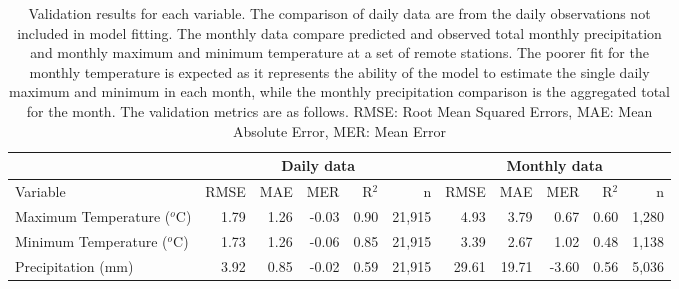 \begin{table}[ht]
\begin{center}
\begin{tabular}{lrrrrr|rrrrr}
  \hline & \multicolumn{5}{c|}{Daily data} & \multicolumn{5}{c}{Monthly data} \\ \hline
Variable & RMSE & MAE & MER & R$^2$ & n  & RMSE & MAE & MER & R$^2$ & n \\ 
  \hline
Maximum Temperature ($^o$C) & 1.79 & 1.26 & -0.03 & 0.90 & 21,915 & 4.93 & 3.79 & 0.67 & 0.60 &1,280\\ 
  Minimum Temperature  ($^o$C) & 1.73 & 1.26 & -0.06 & 0.85 & 21,915 &
  3.39 & 2.67 & 1.02 & 0.48 & 1,138 \\ 
  Precipitation (mm) & 3.92 & 0.85 & -0.02 & 0.59 & 21,915 & 29.61 &
  19.71 & -3.60 & 0.56 & 5,036\\ 
   \hline
\end{tabular}
\caption{Validation results for each variable.  The comparison of daily data are from the daily observations not included in model fitting. The monthly data compare predicted and observed total monthly precipitation and monthly maximum and minimum temperature at a set of remote stations.  The poorer fit for the monthly temperature is expected as it represents the ability of the model to estimate the single daily maximum and minimum in each month, while the monthly precipitation comparison is the aggregated total for the month. The validation metrics are as follows. RMSE: Root Mean Squared Errors, MAE: Mean Absolute Error, MER: Mean Error}
\label{tab:valid}
\end{center}
\end{table}
